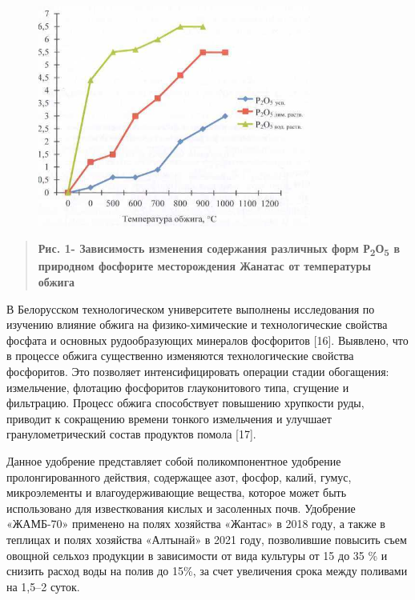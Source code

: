 \begin{figure}[H]
	\centering
	\includegraphics[width=0.8\textwidth]{assets/1082}
	\caption*{}
\end{figure}

\begin{quote}
{\bfseries Рис. 1- Зависимость изменения содержания различных форм
Р\textsubscript{2}О\textsubscript{5} в природном фосфорите месторождения
Жанатас от температуры обжига}
\end{quote}

В Белорусском технологическом университете выполнены исследования по
изучению влияние обжига на физико-химические и технологические свойства
фосфата и основных рудообразующих минералов фосфоритов {[}16{]}.
Выявлено, что в процессе обжига существенно изменяются технологические
свойства фосфоритов. Это позволяет интенсифицировать операции стадии
обогащения: измельчение, флотацию фосфоритов глауконитового типа,
сгущение и фильтрацию. Процесс обжига способствует повышению хрупкости
руды, приводит к сокращению времени тонкого измельчения и улучшает
гранулометрический состав продуктов помола {[}17{]}.

Данное удобрение представляет собой поликомпонентное удобрение
пролонгированного действия, содержащее азот, фосфор, калий, гумус,
микроэлементы и влагоудерживающие вещества, которое может быть
использовано для известкования кислых и засоленных почв. Удобрение
«ЖАМБ-70» применено на полях хозяйства «Жантас» в 2018 году, а также в
теплицах и полях хозяйства «Алтынай» в 2021 году, позволившие повысить
съем овощной сельхоз продукции в зависимости от вида культуры от 15 до
35 \% и снизить расход воды на полив до 15\%, за счет увеличения срока
между поливами на 1,5--2 суток.

